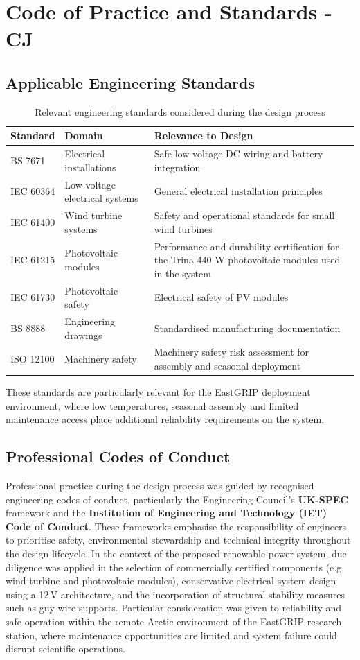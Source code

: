 \documentclass[11pt,a4paper]{article}
\begin{document}
\section{Code of Practice and Standards - CJ}

\subsection{Applicable Engineering Standards}

\begin{table}[H]
\centering
\caption{Relevant engineering standards considered during the design process}
\begin{tabular}{l l p{9cm}}
\hline
Standard & Domain & Relevance to Design \\
\hline
BS 7671 & Electrical installations & Safe low-voltage DC wiring and battery integration \\
IEC 60364 & Low-voltage electrical systems & General electrical installation principles \\
IEC 61400 & Wind turbine systems & Safety and operational standards for small wind turbines \\
IEC 61215 & Photovoltaic modules & Performance and durability certification for the Trina 440 W photovoltaic modules used in the system \\
IEC 61730 & Photovoltaic safety & Electrical safety of PV modules \\
BS 8888 & Engineering drawings & Standardised manufacturing documentation \\
ISO 12100 & Machinery safety & Machinery safety risk assessment for assembly and seasonal deployment \\
\hline
\end{tabular}
\end{table}
These standards are particularly relevant for the EastGRIP deployment environment, where low temperatures, seasonal assembly and limited maintenance access place additional reliability requirements on the system.

\subsection{Professional Codes of Conduct}
Professional practice during the design process was guided by recognised engineering codes of conduct, particularly the Engineering Council’s \textbf{UK-SPEC} framework and the \textbf{Institution of Engineering and Technology (IET) Code of Conduct}. These frameworks emphasise the responsibility of engineers to prioritise safety, environmental stewardship and technical integrity throughout the design lifecycle. In the context of the proposed renewable power system, due diligence was applied in the selection of commercially certified components (e.g. wind turbine and photovoltaic modules), conservative electrical system design using a 12\,V architecture, and the incorporation of structural stability measures such as guy-wire supports. Particular consideration was given to reliability and safe operation within the remote Arctic environment of the EastGRIP research station, where maintenance opportunities are limited and system failure could disrupt scientific operations.
\end{document}
